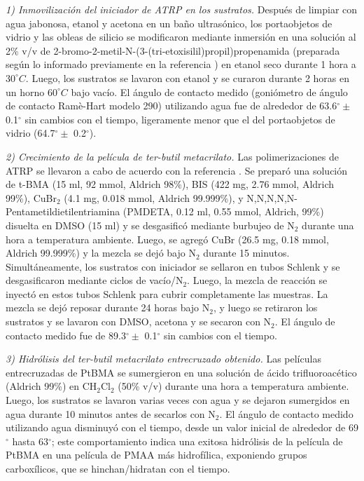 \emph{1) Inmovilizaci\'on del iniciador de ATRP en los sustratos.}
 Despu\'es de limpiar con agua jabonosa, etanol y acetona en un ba\~no ultras\'onico, los portaobjetos de vidrio y las obleas de silicio se modificaron mediante inmersi\'on en una soluci\'on al 2\% v/v de 2-bromo-2-metil-N-(3-(tri-etoxisilil)propil)propenamida (preparada seg\'un lo informado previamente en la referencia \cite{Yameen2008}) en etanol seco durante 1 hora a $30^\circ C$. Luego, los sustratos se lavaron con etanol y se curaron durante 2 horas en un horno $60^\circ C$ bajo vac\'io. El \'angulo de contacto medido (goni\'ometro de \'angulo de contacto Ramè-Hart modelo 290) utilizando agua fue de alrededor de 63.6$^\circ \pm $0.1$^\circ$ sin cambios con el tiempo, ligeramente menor que el del portaobjetos de vidrio (64.7$^\circ \pm$ 0.2$^\circ$).%




\emph{2) Crecimiento de la pel\'icula de ter-butil metacrilato.}
 Las polimerizaciones de ATRP se llevaron a cabo de acuerdo con la referencia \cite{Brown2009}. Se prepar\'o una soluci\'on de t-BMA (15 ml, 92 mmol, Aldrich 98\%), BIS (422 mg, 2.76 mmol, Aldrich 99\%), CuBr$_2$ (4.1 mg, 0.018 mmol, Aldrich 99.999\%), y N,N,N,N,N-Pentametildietilentriamina (PMDETA, 0.12 ml, 0.55 mmol, Aldrich, 99\%) disuelta en DMSO (15 ml) y se desgasific\'o mediante burbujeo de N$_2$ durante una hora a temperatura ambiente. Luego, se agreg\'o CuBr (26.5 mg, 0.18 mmol, Aldrich 99.999\%) y la mezcla se dej\'o bajo N$_2$ durante 15 minutos. Simult\'aneamente, los sustratos con iniciador se sellaron en tubos Schlenk y se desgasificaron mediante ciclos de vac\'io/N$_2$. Luego, la mezcla de reacci\'on se inyect\'o en estos tubos Schlenk para cubrir completamente las muestras. La mezcla se dej\'o reposar durante 24 horas bajo N$_2$, y luego se retiraron los sustratos y se lavaron con DMSO, acetona y se secaron con N$_2$. El \'angulo de contacto medido fue de 89.3$^\circ \pm$ 0.1$^\circ$ sin cambios con el tiempo.

\emph{3) Hidr\'olisis del ter-butil metacrilato entrecruzado obtenido.}
 Las pel\'iculas entrecruzadas de PtBMA se sumergieron en una soluci\'on de \'acido trifluoroac\'etico (Aldrich 99\%) en CH$_2$Cl$_2$ (50\% v/v) durante una hora a temperatura ambiente. Luego, los sustratos se lavaron varias veces con agua y se dejaron sumergidos en agua durante 10 minutos antes de secarlos con N$_2$. El \'angulo de contacto medido utilizando agua disminuy\'o con el tiempo, desde un valor inicial de alrededor de 69$^\circ$ hasta 63$^\circ$; este comportamiento indica una exitosa hidr\'olisis de la pel\'icula de PtBMA en una pel\'icula de PMAA m\'as hidrofílica, exponiendo grupos carbox\'ilicos, que se hinchan/hidratan con el tiempo.


